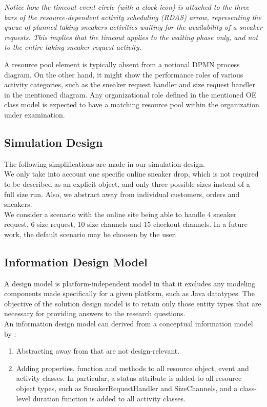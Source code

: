 \documentclass{article}
\begin{document}
\FloatBarrier

{\em Notice how the timeout event circle (with a clock icon) is attached to the three bars of the resource-dependent activity scheduling (RDAS) arrow, representing the queue of planned taking sneakers activities waiting for the availability of a sneaker requests. This implies that the timeout applies to the waiting phase only, and not to the entire taking sneaker request activity.}

A resource pool element is typically absent from a notional DPMN process diagram. On the other hand, it might show the performance roles of various activity categories, such as the sneaker request handler and size request handler in the mentioned diagram. Any organizational role defined in the mentioned OE class model is expected to have a matching resource pool within the organization under examination.

\subsection{Simulation Design}

The following simplifications are made in our simulation design. \\
We only take into account one specific online sneaker drop, which is not required to be described as an explicit object, and only three possible sizes instead of a full size run. Also, we abstract away from individual customers, orders and sneakers.\\
We consider a scenario with the online site being able to handle 4 sneaker request, 6 size request, 10 size channels and 15 checkout channels. In a future work, the default scenario may be choosen by the user.

\subsection{Information Design Model}
A design model is platform-independent model in that it excludes any modeling components made specifically for a given platform, such as Java datatypes. The objective of the solution design model is to retain only those entity types that are necessary for providing answers to the research questions. \\
An information design model can derived from a conceptual information model by \cite{Wagner}:
\begin{enumerate}
\item Abstracting away from that are not design-relevant.
\item Adding properties, function and methods to all resource object, event and activity classes. In particular, a status attribute is added to all resource object types, such as SneakerRequestHandler and SizeChannels, and a class-level duration function is added to all activity classes.
\end{enumerate}
\end{document}

